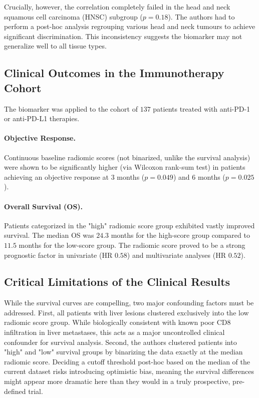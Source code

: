 \documentclass[10pt]{article}
\begin{document}
Crucially, however, the correlation completely failed in the head and neck squamous cell carcinoma (HNSC) subgroup ($p = 0.18$). The authors had to perform a post-hoc analysis regrouping various head and neck tumours to achieve significant discrimination. This inconsistency suggests the biomarker may not generalize well to all tissue types.

\subsection{Clinical Outcomes in the Immunotherapy Cohort}
The biomarker was applied to the cohort of $137$ patients treated with anti-PD-1 or anti-PD-L1 therapies.
\paragraph{Objective Response.} Continuous baseline radiomic scores (not binarized, unlike the survival analysis) were shown to be significantly higher (via Wilcoxon rank-sum test) in patients achieving an objective response at $3$ months ($p=0.049$) and $6$ months ($p=0.025$).
\paragraph{Overall Survival (OS).} Patients categorized in the "high" radiomic score group exhibited vastly improved survival. The median OS was $24.3$ months for the high-score group compared to $11.5$ months for the low-score group. The radiomic score proved to be a strong prognostic factor in univariate (HR $0.58$) and multivariate analyses (HR $0.52$).

\subsection{Critical Limitations of the Clinical Results}
While the survival curves are compelling, two major confounding factors must be addressed. First, all patients with liver lesions clustered exclusively into the low radiomic score group. While biologically consistent with known poor CD8 infiltration in liver metastases, this acts as a major uncontrolled clinical confounder for survival analysis. Second, the authors clustered patients into "high" and "low" survival groups by binarizing the data exactly at the median radiomic score. Deciding a cutoff threshold post-hoc based on the median of the current dataset risks introducing optimistic bias, meaning the survival differences might appear more dramatic here than they would in a truly prospective, pre-defined trial.
\end{document}
